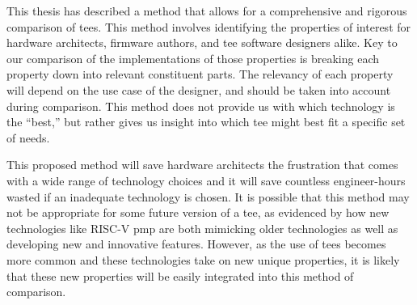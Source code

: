 This thesis has described a method that allows for a comprehensive and rigorous comparison of \glspl{tee}. This method involves identifying the properties of interest for hardware architects, firmware authors, and \gls{tee} software designers alike. Key to our comparison of the implementations of those properties is breaking each property down into relevant constituent parts. The relevancy of each property will depend on the use case of the designer, and should be taken into account during comparison. This method does not provide us with which technology is the ``best,'' but rather gives us insight into which \gls{tee} might best fit a specific set of needs.

This proposed method will save hardware architects the frustration that comes with a wide range of technology choices and it will save countless engineer-hours wasted if an inadequate technology is chosen. It is possible that this method may not be appropriate for some future version of a \gls{tee}, as evidenced by how new technologies like RISC-V \gls{pmp} are both mimicking older technologies as well as developing new and innovative features. However, as the use of \glspl{tee} becomes more common and these technologies take on new unique properties, it is likely that these new properties will be easily integrated into this method of comparison.